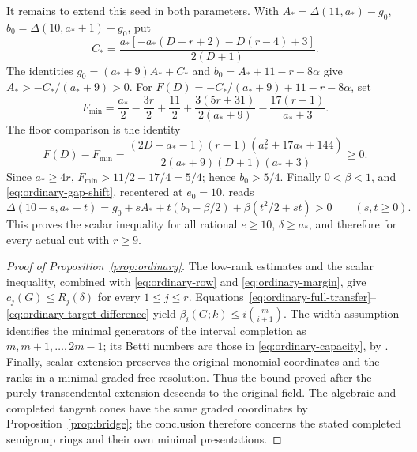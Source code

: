 It remains to extend this seed in both parameters.
With $A_*=\Delta(11,a_*)-g_0$, $b_0=\Delta(10,a_*+1)-g_0$, put
\[
 C_*=\frac{a_*[-a_*(D-r+2)-D(r-4)+3]}{2(D+1)}.
\]
The identities $g_0=(a_*+9)A_*+C_*$ and
$b_0=A_*+11-r-8\alpha$ give $A_*>-C_* /(a_*+9)>0$.
For $F(D)=-C_* /(a_*+9)+11-r-8\alpha$, set
\[
 F_{\min}=\frac{a_*}2-\frac{3r}2+\frac{11}2
       +\frac{3(5r+31)}{2(a_*+9)}-\frac{17(r-1)}{a_*+3}.
\]
The floor comparison is the identity
\[
 F(D)-F_{\min}=
 \frac{(2D-a_*-1)(r-1)(a_*^2+17a_*+144)}
 {2(a_*+9)(D+1)(a_*+3)}\ge0.
\]
Since $a_*\ge4r$, $F_{\min}>11/2-17/4=5/4$;
hence $b_0>5/4$.  Finally $0<\beta<1$, and
\eqref{eq:ordinary-gap-shift}, recentered at $e_0=10$, reads
\[
 \Delta(10+s,a_*+t)=g_0+sA_*+t(b_0-\beta/2)
                       +\beta(t^2/2+st)>0
 \qquad(s,t\ge0).
\]
This proves the scalar inequality for all rational $e\ge10$,
$\delta\ge a_*$, and therefore for every actual cut with $r\ge9$.

\begin{proof}[Proof of Proposition~\ref{prop:ordinary}]
The low-rank estimates and the scalar inequality, combined with
\eqref{eq:ordinary-row} and \eqref{eq:ordinary-margin}, give
$c_j(G)\le R_j(\delta)$ for every $1\le j\le r$.
Equations~\eqref{eq:ordinary-full-transfer}--\eqref{eq:ordinary-target-difference}
yield $\beta_i(G;k)\le i\binom m{i+1}$.
The width assumption identifies the minimal generators of the interval
completion as $m,m+1,\ldots,2m-1$; its Betti numbers are those in
\eqref{eq:ordinary-capacity}, by \cite{APFormula,APCone}.
Finally, scalar extension preserves the original monomial coordinates
and the ranks in a minimal graded free resolution.  Thus the bound
proved after the purely transcendental extension descends to the
original field.  The algebraic and completed tangent cones have the
same graded coordinates by Proposition~\ref{prop:bridge}; the conclusion
therefore concerns the stated completed semigroup rings and their own
minimal presentations.
\end{proof}
